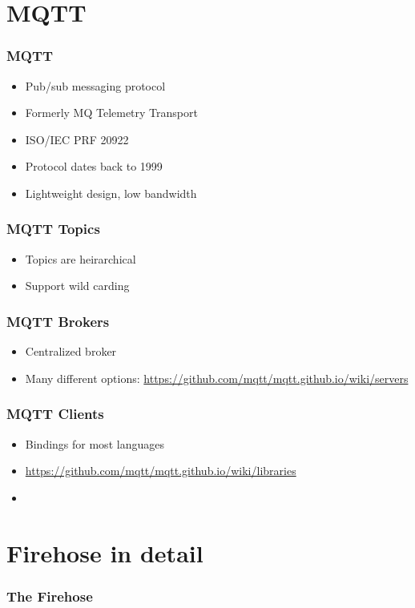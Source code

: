 \documentclass[aspectratio=169,11pt,hyperref={colorlinks=true}]{beamer}
\begin{document}
\section{MQTT}
\begin{frame}
	\frametitle{MQTT}
    \begin{itemize}
        \item Pub/sub messaging protocol
        \item Formerly MQ Telemetry Transport
        \item ISO/IEC PRF 20922
        \item Protocol dates back to 1999
        \item Lightweight design, low bandwidth
    \end{itemize}
\end{frame}

\begin{frame}
    \frametitle{MQTT Topics}
    \begin{itemize}
        \item Topics are heirarchical
        \item Support wild carding
    \end{itemize}
\end{frame}

\begin{frame}
    \frametitle{MQTT Brokers}
    \begin{itemize}
        \item Centralized broker
        \item Many different options: \href{https://github.com/mqtt/mqtt.github.io/wiki/servers}{https://github.com/mqtt/mqtt.github.io/wiki/servers}
     \end{itemize}
\end{frame}

\begin{frame}
    \frametitle{MQTT Clients}
    \begin{itemize}
        \item Bindings for most languages
        \item \href{https://github.com/mqtt/mqtt.github.io/wiki/libraries}{https://github.com/mqtt/mqtt.github.io/wiki/libraries}
        \item 
    \end{itemize}
\end{frame}


\section{Firehose in detail}
\begin{frame}
    \frametitle{The Firehose}
    
\end{frame}
\end{document}
